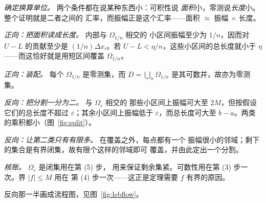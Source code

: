 \begin{flow}[证明的脉络]
  \item \textit{确定换算单位。} 两个条件都在说某种东西小：可积性说
        \emph{面积}小，零测说\emph{长度}小。整个证明就是二者之间的
        汇率，而振幅正是这个汇率——面积 $\approx$ 振幅 $\times$ 长度。
  \item \textit{正向：把面积读成长度。} 内部与 $\Omega_{1/n}$ 相交的
        小区间振幅至少为 $1/n$，因而对 $U-L$ 的贡献至少是
        $(1/n)\Delta x_i$。若 $U-L<\eta/n$，这些小区间的总长度就小于
        $\eta$——而这恰好就是用短区间覆盖 $\Omega_{1/n}$。
  \item \textit{正向：装配。} 每个 $\Omega_{1/n}$ 是零测集，而
        $D = \bigcup_n \Omega_{1/n}$ 是其可数并，故亦为零测集。
  \item \textit{反向：把分割一分为二。} 与 $\Omega_\varepsilon$ 相交的
        那些小区间上振幅可大至 $2M$，但按假设它们的总长度不超过
        $\varepsilon$；其余小区间上振幅低于 $\varepsilon$，而总长度可大至
        $b-a$。两类的乘积都小（图~\ref{fig:split}）。
  \item \textit{反向：让第二类只有有限多。} 在覆盖之外，每点都有一个
        振幅很小的邻域；剩下的集合是有界闭集，故有限个这样的邻域即可
        覆盖，并由此定出一个分割。
  \item \textit{核账。} $\Omega_\varepsilon$ 是闭集用在第 (5) 步，
        用来保证剩余集紧。可数性用在第 (3) 步一次。界 $|f|\le M$ 用在
        第 (4) 步一次——这正是定理需要 $f$ 有界的原因。
\end{flow}

反向那一半画成流程图，见图~\ref{fig:lebflow}。


